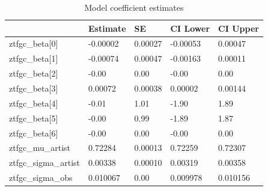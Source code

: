 \begin{table}[htbp]
\caption{Model coefficient estimates}
\label{tab:coefficients}
\begin{tabular}{lllll}
\toprule
 & Estimate & SE & CI Lower & CI Upper \\
\midrule
ztfgc\_beta[0] & -0.00002 & 0.00027 & -0.00053 & 0.00047 \\
ztfgc\_beta[1] & -0.00074 & 0.00047 & -0.00163 & 0.00011 \\
ztfgc\_beta[2] & -0.00 & 0.00 & -0.00 & 0.00 \\
ztfgc\_beta[3] & 0.00072 & 0.00038 & 0.00002 & 0.00144 \\
ztfgc\_beta[4] & -0.01 & 1.01 & -1.90 & 1.89 \\
ztfgc\_beta[5] & -0.00 & 0.99 & -1.89 & 1.87 \\
ztfgc\_beta[6] & -0.00 & 0.00 & -0.00 & 0.00 \\
ztfgc\_mu\_artist & 0.72284 & 0.00013 & 0.72259 & 0.72307 \\
ztfgc\_sigma\_artist & 0.00338 & 0.00010 & 0.00319 & 0.00358 \\
ztfgc\_sigma\_obs & 0.010067 & 0.00 & 0.009978 & 0.010156 \\
\bottomrule
\end{tabular}
\end{table}
